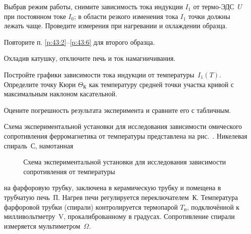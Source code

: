 \begin{lab:task}
\item \label{p:43:6}
  Выбрав режим работы, снимите зависимость тока индукции $I_1$ от термо-ЭДС~$U$
при постоянном токе $I_0$; в области резкого изменения тока $I_1$ точки 
должны лежать чаще. Проведите измерения при нагревании и охлаждении образца.

\item Повторите п. \ref{p:43:2}--\ref{p:43:6} для второго образца.
\item Охладив катушку, отключите печь и ток намагничивания.


\item Постройте графики зависимости тока индукции от температуры~$I_1(T)$. 
Определите точку Кюри $\Theta_{К}$ как температуру средней точки участка
кривой с максимальным наклоном касательной.



\item Оцените погрешность результата эксперимента и сравните его с табличным.

\end{lab:task}


\experiment

Схема экспериментальной установки для исследования зависимости омического
сопротивления ферромагнетика от температуры представлена 
на рис.~. 
Никелевая спираль~С, намотанная
\begin{wrapfigure}{o}{0.5\textwidth}
    \centering\small
    \caption{Схема экспериментальной установки для исследования
        зависимости сопротивления от температуры}
\end{wrapfigure}
на фарфоровую трубку, 
заключена в керамическую трубку и помещена в трубчатую печь~П. 
Нагрев печи регулируется переключателем~К. Температура фарфоровой трубки 
(спирали) контролируется термопарой $T_{\text{п}}$, подключённой к 
милливольтметру~V, прокалиброванному в градусах. Сопротивление
спирали измеряется мультиметром~$\Omega$.


